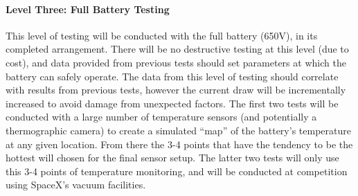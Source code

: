 \documentclass[main.tex]{subfiles}
\begin{document}
    \paragraph{Level Three: Full Battery Testing}
    This level of testing will be conducted with the full battery (650V), in its completed arrangement. There will be no destructive testing at this level (due to cost), and data provided from previous tests should set parameters at which the battery can safely operate. The data from this level of testing should correlate with results from previous tests, however the current draw will be incrementally increased to avoid damage from unexpected factors. The first two tests will be conducted with a large number of temperature sensors (and potentially a thermographic camera) to create a simulated “map” of the battery’s temperature at any given location. From there the 3-4 points that have the tendency to be the hottest will chosen for the final sensor setup. The latter two tests will only use this 3-4 points of temperature monitoring, and will be conducted at competition using SpaceX’s vacuum facilities.
\end{document}
